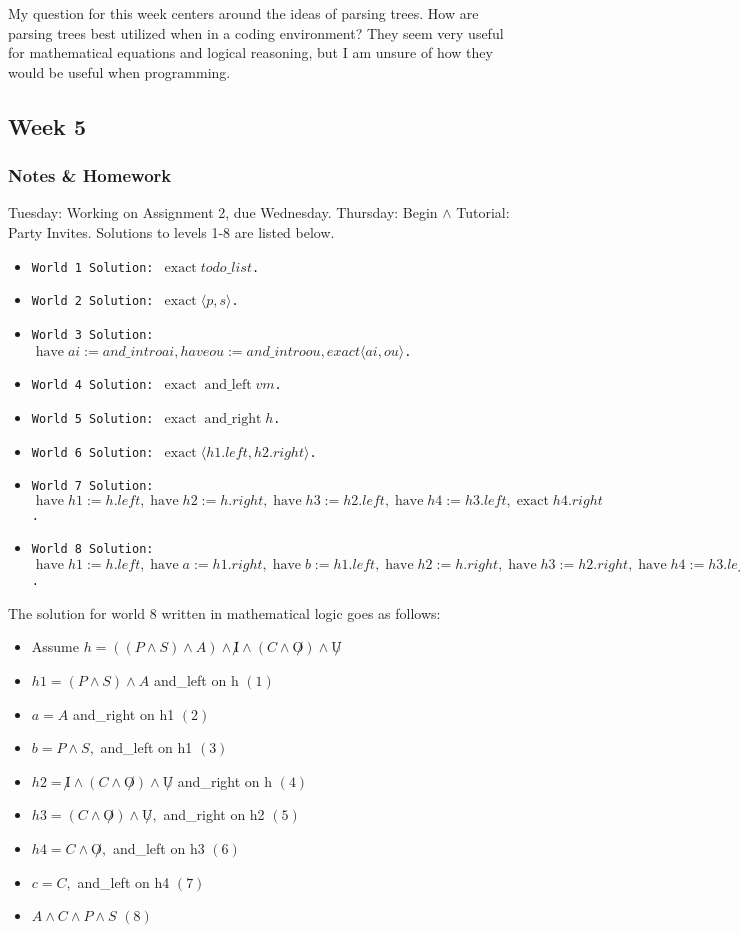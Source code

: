 \documentclass{article}
\DeclareMathOperator{\have}{have}
\DeclareMathOperator{\exact}{exact}
\DeclareMathOperator{\andLeft}{and\_left}
\DeclareMathOperator{\andRight}{and\_right}
\theoremstyle{theorem}
\theoremstyle{definition}
\theoremstyle{remark}
\begin{document}
My question for this week centers around the ideas of parsing trees. How are parsing trees best utilized when in a coding environment? They seem very useful for mathematical equations and logical reasoning, but I am unsure of how they would be useful when programming.


\subsection{Week 5}

\subsubsection*{Notes \& Homework}
Tuesday: Working on Assignment 2, due Wednesday. 
\newline Thursday: Begin $\wedge$ Tutorial: Party Invites. Solutions to levels 1-8 are listed below.

\begin{itemize}
  \item \texttt{World 1 Solution: $\exact todo\_list$.}
  \item \texttt{World 2 Solution: $\exact \langle p, s \rangle$.}
  \item \texttt{World 3 Solution: $\have ai := and\_intro a i, have ou := and\_intro o u, exact \langle ai, ou \rangle$.}
  \item \texttt{World 4 Solution: $\exact \andLeft vm$.}
  \item \texttt{World 5 Solution: $\exact \andRight h$.}
  \item \texttt{World 6 Solution: $\exact \langle h1.left, h2.right \rangle$.}
  \item \texttt{World 7 Solution: $\have h1 := h.left, \have h2 := h.right, \have h3 := h2.left, \have h4 := h3.left, \exact h4.right$.}
  \item \texttt{World 8 Solution: $\have h1 := h.left, \have a := h1.right, \have b := h1.left, \have h2 := h.right, \have h3 := h2.right, \have h4 := h3.left, \have c := h4.left, \exact \langle a, b, c\rangle$.}
\end{itemize}

The solution for world 8 written in mathematical logic goes as follows: 

\begin{itemize}
  \item Assume $h=((P \wedge S) \wedge A) \wedge \not I \wedge (C \wedge \not O) \wedge \not U$
  \item $h1 = (P \wedge S) \wedge A$ and\_left on h $(1)$
  \item $a = A$ and\_right on h1 $(2)$
  \item $b = P \wedge S, $ and\_left on h1 $(3)$ 
  \item $h2 = \not I \wedge (C \wedge \not O) \wedge \not U$ and\_right on h $(4)$
  \item $h3 = (C \wedge \not O) \wedge \not U, $ and\_right on h2 $(5)$
  \item $h4 = C \wedge \not O, $ and\_left on h3 $(6)$
  \item $c = C, $ and\_left on h4 $(7)$
  \item $A \wedge C \wedge P \wedge S$ $(8)$
\end{itemize}
\end{document}
